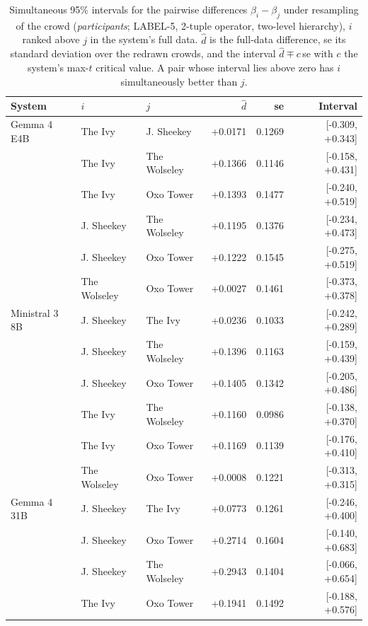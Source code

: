 \begin{table}[htbp]
\centering
\caption{Simultaneous 95\% intervals for the pairwise differences $\beta_i-\beta_j$ under resampling of the crowd (\emph{participants}; LABEL-5, 2-tuple operator, two-level hierarchy), $i$ ranked above $j$ in the system's full data. $\hat d$ is the full-data difference, se its standard deviation over the redrawn crowds, and the interval $\hat d \mp c\,$se with $c$ the system's max-$t$ critical value. A pair whose interval lies above zero has $i$ simultaneously better than $j$.}
\label{tab:cdm_simultaneous_pairs}
\small
\begin{tabular}{lllrrr}
\toprule
\textbf{System} & \textbf{$i$} & \textbf{$j$} & \textbf{$\hat d$} & \textbf{se} & \textbf{Interval} \\
\midrule
  Gemma 4 E4B & The Ivy & J. Sheekey & +0.0171 & 0.1269 & [-0.309, +0.343] \\
   & The Ivy & The Wolseley & +0.1366 & 0.1146 & [-0.158, +0.431] \\
   & The Ivy & Oxo Tower & +0.1393 & 0.1477 & [-0.240, +0.519] \\
   & J. Sheekey & The Wolseley & +0.1195 & 0.1376 & [-0.234, +0.473] \\
   & J. Sheekey & Oxo Tower & +0.1222 & 0.1545 & [-0.275, +0.519] \\
   & The Wolseley & Oxo Tower & +0.0027 & 0.1461 & [-0.373, +0.378] \\
\addlinespace
  Ministral 3 8B & J. Sheekey & The Ivy & +0.0236 & 0.1033 & [-0.242, +0.289] \\
   & J. Sheekey & The Wolseley & +0.1396 & 0.1163 & [-0.159, +0.439] \\
   & J. Sheekey & Oxo Tower & +0.1405 & 0.1342 & [-0.205, +0.486] \\
   & The Ivy & The Wolseley & +0.1160 & 0.0986 & [-0.138, +0.370] \\
   & The Ivy & Oxo Tower & +0.1169 & 0.1139 & [-0.176, +0.410] \\
   & The Wolseley & Oxo Tower & +0.0008 & 0.1221 & [-0.313, +0.315] \\
\addlinespace
  Gemma 4 31B & J. Sheekey & The Ivy & +0.0773 & 0.1261 & [-0.246, +0.400] \\
   & J. Sheekey & Oxo Tower & +0.2714 & 0.1604 & [-0.140, +0.683] \\
   & J. Sheekey & The Wolseley & +0.2943 & 0.1404 & [-0.066, +0.654] \\
   & The Ivy & Oxo Tower & +0.1941 & 0.1492 & [-0.188, +0.576] \\

\end{tabular}
\end{table}

